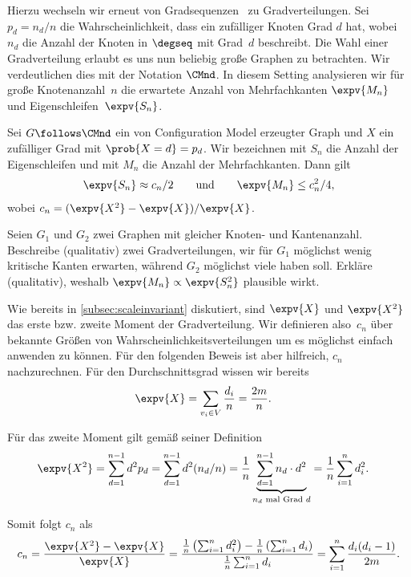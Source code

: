 Hierzu wechseln wir erneut von Gradsequenzen~\degseq{} zu Gradverteilungen.
Sei $p_d = n_d / n$ die Wahrscheinlichkeit, dass ein zufälliger Knoten Grad $d$ hat, wobei $n_d$ die Anzahl der Knoten in $\degseq$ mit Grad~$d$ beschreibt.
Die Wahl einer Gradverteilung erlaubt es uns nun beliebig große Graphen zu betrachten.
Wir verdeutlichen dies mit der Notation $\CMnd$.
In diesem Setting analysieren wir für große Knotenanzahl~$n$ die erwartete Anzahl von Mehrfachkanten $\expv{M_n}$ und Eigenschleifen~$\expv{S_n}$.

\begin{lemma}\label{lem:cm_anzahl_nicht_einfach}
    Sei $G \follows \CMnd$ ein von Configuration Model erzeugter Graph und $X$ ein zufälliger Grad mit $\prob{X = d} = p_d$.
    Wir bezeichnen mit $S_n$ die Anzahl der Eigenschleifen und mit $M_n$ die Anzahl der Mehrfachkanten.
    Dann gilt
    \begin{align}
        \expv{S_n} \approx c_n/2 \qquad \text{und} \qquad \expv{M_n} \le c_n^2 / 4,
    \end{align}
    wobei $c_n = (\expv{X^2} - \expv{X}) / \expv{X}$.
\end{lemma}

\begin{exercise}
    Seien $G_1$ und $G_2$ zwei Graphen mit gleicher Knoten- und Kantenanzahl.
    Beschreibe (qualitativ) zwei Gradverteilungen, \sd wir für $G_1$ möglichst wenig kritische Kanten erwarten, während $G_2$ möglichst viele haben soll.
    Erkläre (qualitativ), weshalb $\expv{M_n} \propto \expv{S_n^2}$ plausible wirkt.
\end{exercise}

\begin{remark}
    Wie bereits in \cref{subsec:scaleinvariant} diskutiert, sind $\expv{X}$ und $\expv{X^2}$ das erste bzw. zweite Moment der Gradverteilung.
    Wir definieren also~$c_n$ über bekannte Größen von Wahrscheinlichkeitsverteilungen um es möglichst einfach anwenden zu können.
    Für den folgenden Beweis ist aber hilfreich, $c_n$ nachzurechnen.
    Für den Durchschnittsgrad wissen wir bereits
    \begin{align}
        \expv{X} & = \sum_{v_i \in V} \frac{d_i}{n} = \frac {2m}{n}.
    \end{align}

    \noindent
    Für das zweite Moment gilt gemäß seiner Definition
    \begin{align}
        \expv{X^2}
         & = \sum_{d=1}^{n-1} d^2 p_d
        = \sum_{d=1}^{n-1} d^2 (n_d / n)
        = \frac 1 n \underbrace{\sum_{d=1}^{n-1} n_d \cdot d^2}_\text{$n_d$ mal Grad $d$}
        = \frac 1 n \sum_{i=1}^n d_i^2.
    \end{align}

    \noindent
    Somit folgt $c_n$ als
    \begin{align}
        c_n
        = \frac{\expv{X^2} - \expv{X}}{\expv{X}}
        = \frac{ \frac 1 n \left(\sum_{i=1}^n d_i^2\right) - \frac 1 n \left(\sum_{i=1}^n d_i\right)}{\frac 1 n \sum_{i=1}^n d_i}
        = \sum_{i=1}^n \frac{d_i (d_i - 1)}{2m}.
    \end{align}
\end{remark}

